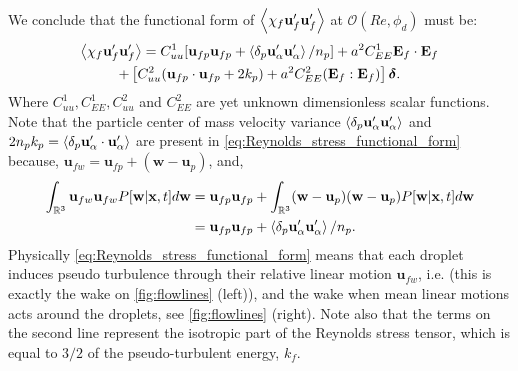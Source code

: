 We conclude that the functional form of $\left<\chi_f \textbf{u}_f' \textbf{u}_f'\right>$ at $\mathcal{O}(Re,\phi_d)$ must be:
\begin{multline}
    \avg{\chi_f \textbf{u}_f' \textbf{u}_f'}
    =
    C_{uu}^1 [\textbf{u}_{fp} \textbf{u}_{fp}+ \pavg{\textbf{u}_\alpha' \textbf{u}_\alpha'}/n_p]
    +a^2 C_{EE}^1 \textbf{E}_f\cdot \textbf{E}_f \\
    + \left[ 
        C_{uu}^2 (\textbf{u}_{fp}\cdot  \textbf{u}_{fp} + 2k_p)
        +  a^2 C_{EE}^2 (\textbf{E}_f : \textbf{E}_f)
    \right]\bm\delta.
    \label{eq:Reynolds_stress_functional_form}
\end{multline}
Where $C_{uu}^1,C_{EE}^1,C_{uu}^2$ and $C_{EE}^2$ are yet unknown dimensionless scalar functions. 
Note that the particle center of mass velocity variance $\left<\delta_p \textbf{u}_\alpha' \textbf{u}_\alpha'\right>$ and $2n_pk_p = \left<\delta_p \textbf{u}_\alpha' \cdot \textbf{u}_\alpha'\right>$ are present in \ref{eq:Reynolds_stress_functional_form} because, $\textbf{u}_{fw} = \textbf{u}_{fp}+ (\textbf{w} - \textbf{u}_p)$, and, 
\begin{align}
    \int_{\mathbb{R}^3} \textbf{u}_{fw}\textbf{u}_{fw}P[\textbf{w}|\textbf{x},t] d\textbf{w}
    &= 
    \textbf{u}_{fp}\textbf{u}_{fp}
    + \int_{\mathbb{R}^3} (\textbf{w} - \textbf{u}_p)(\textbf{w} - \textbf{u}_p)P[\textbf{w}|\textbf{x},t] d\textbf{w}\\
    &= 
    \textbf{u}_{fp}\textbf{u}_{fp} 
    + \left<\delta_p \textbf{u}_\alpha'\textbf{u}_\alpha'\right>/n_p. 
\end{align}
Physically \ref{eq:Reynolds_stress_functional_form} means that each droplet induces pseudo turbulence through their relative linear motion $\textbf{u}_{fw}$, i.e. (this is exactly the wake on \ref{fig:flowlines} (left)), and the wake when mean linear motions acts around the droplets, see  \ref{fig:flowlines} (right). 
Note also that the terms on the second line represent the isotropic part of the Reynolds stress tensor,  which is equal to $3/2$ of the pseudo-turbulent energy, $k_f$. 


